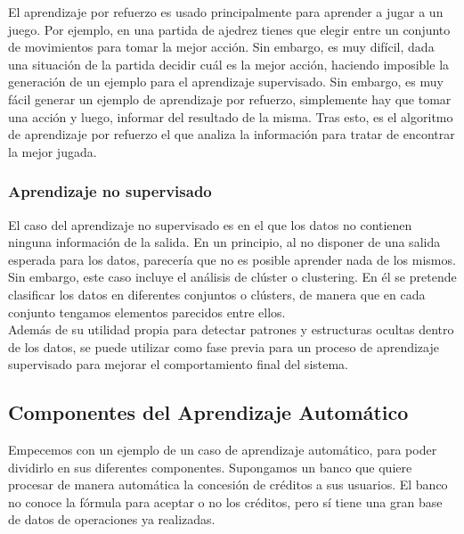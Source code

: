 El aprendizaje por refuerzo es usado principalmente para aprender a jugar a un juego. Por ejemplo, en una partida de ajedrez tienes que elegir entre un conjunto de movimientos para tomar la mejor acción. Sin embargo, es muy difícil, dada una situación de la partida decidir cuál es la mejor acción, haciendo imposible la generación de un ejemplo para el aprendizaje supervisado. Sin embargo, es muy fácil generar un ejemplo de aprendizaje por refuerzo, simplemente hay que tomar una acción y luego, informar del resultado de la misma. Tras esto, es el algoritmo de aprendizaje por refuerzo el que analiza la información para tratar de encontrar la mejor jugada.\\

\subsubsection{Aprendizaje no supervisado}

El caso del aprendizaje no supervisado es en el que los datos no contienen ninguna información de la salida. En un principio, al no disponer de una salida esperada para los datos, parecería que no es posible aprender nada de los mismos. Sin embargo, este caso incluye el análisis de clúster o clustering. En él se pretende clasificar los datos en diferentes conjuntos o clústers, de manera que en cada conjunto tengamos elementos parecidos entre ellos.\\

Además de su utilidad propia para detectar patrones y estructuras ocultas dentro de los datos, se puede utilizar como fase previa para un proceso de aprendizaje supervisado \cite{lecun-nature} para mejorar el comportamiento final del sistema.\\

\subsection{Componentes del Aprendizaje Automático}

Empecemos con un ejemplo de un caso de aprendizaje automático, para poder dividirlo en sus diferentes componentes. Supongamos un banco que quiere procesar de manera automática la concesión de créditos a sus usuarios. El banco no conoce la fórmula para aceptar o no los créditos, pero sí tiene una gran base de datos de operaciones ya realizadas.\\


